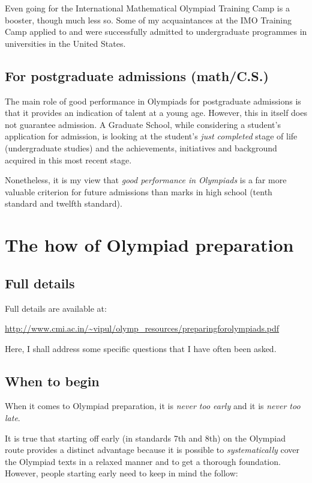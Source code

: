 \documentclass[a4paper]{amsart}
\begin{document}
Even going for the International Mathematical Olympiad Training Camp
is a booster, though much less so. Some of my acquaintances at the IMO
Training Camp applied to and were successfully admitted to
undergraduate programmes in universities in the United States.

\subsection{For postgraduate admissions  (math/C.S.)}

The main role of good performance in Olympiads for postgraduate
admissions is that it provides an indication of talent at a young age.
However, this in itself does not guarantee admission. A Graduate School,
while considering a student's application for admission,
is looking at the student's {\em just completed} stage of life (undergraduate
studies) and the achievements, initiatives and background acquired in this
most recent stage.

Nonetheless, it is my view that {\em good performance in Olympiads} is a far
more valuable criterion for future admissions than marks in high school
(tenth standard and twelfth standard).


\section{The how of Olympiad preparation}

\subsection{Full details}

Full details are available at:

\url{http://www.cmi.ac.in/~vipul/olymp_resources/preparingforolympiads.pdf}

Here, I shall address some specific questions that I have often
been asked.

\subsection{When to begin}

When it comes to Olympiad preparation, it is {\em never too early} and it is
{\em never too late}.

It is true that starting off early (in standards 7th and 8th) on the
Olympiad route provides a distinct advantage because it is possible
to {\em systematically} cover the Olympiad texts in a relaxed manner
and to get a thorough foundation. However, people starting early
need to keep in mind the follow:
\end{document}
